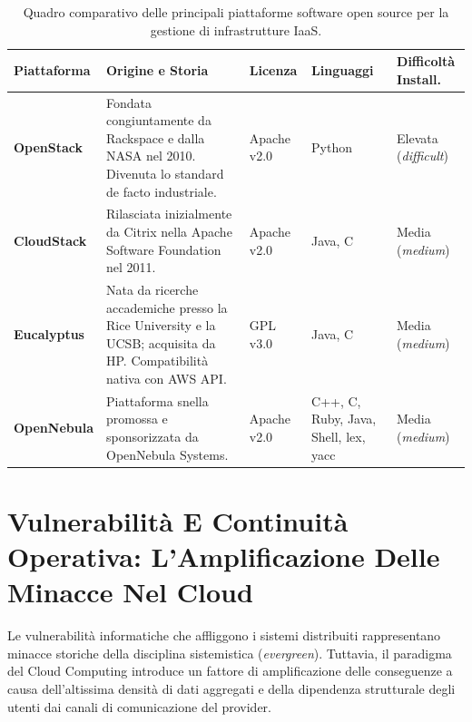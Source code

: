 \documentclass[11pt, a4paper]{article}
\begin{document}
\begin{table}[H]
\centering
\small
\begin{tabularx}{\textwidth}{l p{4cm} l p{2.8cm} l}
\toprule
\textbf{Piattaforma} & \textbf{Origine e Storia} & \textbf{Licenza} & \textbf{Linguaggi} & \textbf{Difficoltà Install.} \\
\midrule
\textbf{OpenStack} & Fondata congiuntamente da Rackspace e dalla NASA nel 2010. Divenuta lo standard de facto industriale. & Apache v2.0 & Python & Elevata (\emph{difficult}) \\
\addlinespace
\textbf{CloudStack} & Rilasciata inizialmente da Citrix nella Apache Software Foundation nel 2011. & Apache v2.0 & Java, C & Media (\emph{medium}) \\
\addlinespace
\textbf{Eucalyptus} & Nata da ricerche accademiche presso la Rice University e la UCSB; acquisita da HP. Compatibilità nativa con AWS API. & GPL v3.0 & Java, C & Media (\emph{medium}) \\
\addlinespace
\textbf{OpenNebula} & Piattaforma snella promossa e sponsorizzata da OpenNebula Systems. & Apache v2.0 & C++, C, Ruby, Java, Shell, lex, yacc & Media (\emph{medium}) \\
\bottomrule
\end{tabularx}
\caption{Quadro comparativo delle principali piattaforme software open source per la gestione di infrastrutture IaaS.}
\label{tab:open_source_iaas}
\end{table}

\newpage

\section{Vulnerabilità E Continuità Operativa: L'Amplificazione Delle Minacce Nel Cloud}

Le vulnerabilità informatiche che affliggono i sistemi distribuiti rappresentano minacce storiche della disciplina sistemistica (\emph{evergreen}). Tuttavia, il paradigma del Cloud Computing introduce un fattore di amplificazione delle conseguenze a causa dell'altissima densità di dati aggregati e della dipendenza strutturale degli utenti dai canali di comunicazione del provider.
\end{document}
